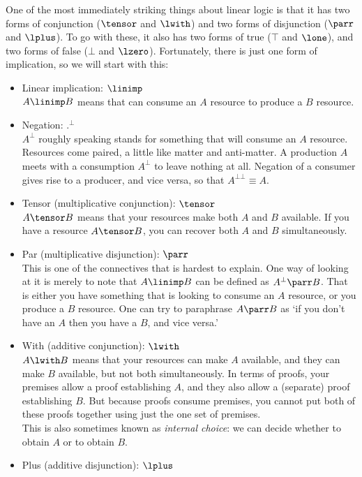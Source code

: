 One of the most immediately striking things about linear logic is that
it has two forms of conjunction ($\tensor$ and $\lwith$) and two forms
of disjunction ($\parr$ and $\lplus$).  To go with these, it also
has two forms of true ($\top$ and $\lone$), and two forms of false
($\bot$ and $\lzero$).  Fortunately, there is just one form of
implication, so we will start with this:
\begin{itemize}
\item Linear implication: $\linimp$\\
$A\linimp B$ means that can consume an $A$ resource to produce a $B$ resource.
\item Negation: $.^{\bot}$\\
$A^{\bot}$ roughly speaking stands for something that will consume an
$A$ resource.  Resources come paired, a little like matter and
anti-matter.  A production $A$ meets with a consumption $A^{\bot}$ to 
leave nothing at all.  Negation of a consumer gives rise to a
producer, and vice versa, so that $A^{\bot\bot}\equiv A$.
\item Tensor (multiplicative conjunction): $\tensor$\\
$A\tensor B$ means that your resources make both $A$ and  $B$
available.
If you have a resource $A\tensor B$, you can recover both $A$ and $B$
simultaneously.
\item Par (multiplicative disjunction): $\parr$\\
This is one of the connectives that is hardest to explain.  One way
of looking at it is merely to note that $A\linimp B$ can be defined
as $A^{\bot}\parr B$.  That is either you have something that is
looking to consume an $A$ resource, or you produce a $B$ resource.
One can try to paraphrase $A\parr B$ as `if you don't have an $A$ then
you have a $B$, and vice versa.'
\item With (additive conjunction): $\lwith$\\
$A\lwith B$ means that your resources can make $A$ available, and they can
make $B$ available, but not both simultaneously.  In terms of proofs, 
your premises
allow a proof establishing $A$, and they also allow a (separate) proof
establishing $B$.  But because proofs consume premises, you cannot put
both of these proofs together using just the one set of premises.\\
This is also sometimes known as {\em internal choice}: we can decide whether
to obtain $A$ or to obtain $B$.  
\item Plus (additive disjunction): $\lplus$\\

\end{itemize}
